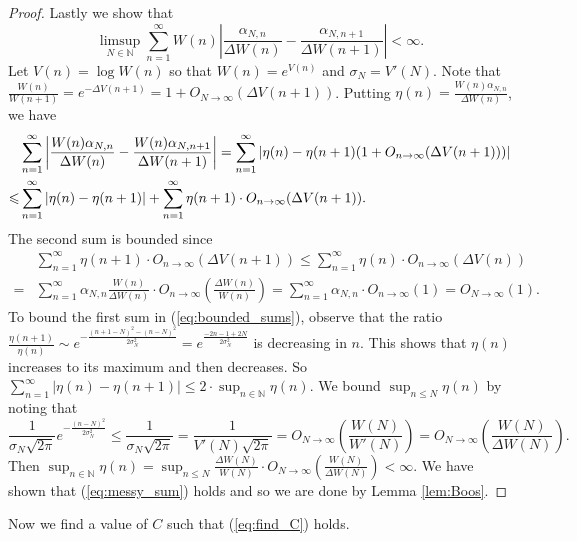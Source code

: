 \documentclass[12pt]{article}
\theoremstyle{plain} %
\theoremstyle{definition} %
\theoremstyle{plain}
\theoremstyle{plain}
\numberwithin{equation}{section}
\newcommand{\N}{\mathbb{N}}
\renewcommand{\leq}{\leqslant}
\newcommand{\1}{\mathbbm{1}}
\newcommand{\oo}{\infty}
\begin{document}
\begin{proof}
Lastly we show that
\begin{equation}\label{eq:messy_sum}
\limsup_{N\in \N} \sum_{n=1}^{\oo}W(n)\left|\frac{\alpha_{N,n}}{\Delta W(n)}-\frac{\alpha_{N,n+1}}{\Delta W(n+1)}\right|<\oo.
\end{equation}
Let $V(n) = \log W(n)$ so that $W(n) = e^{V(n)}$ and $\sigma_N = V'(N)$. Note that $\frac{ W(n)}{ W(n+1)} = e^{-\Delta V(n+1)} = 1+O_{N\to\oo}(\Delta V(n+1))$. Putting $\eta(n)= \frac{W(n)\alpha_{N,n}}{\Delta W(n)}$, we have
\begin{align}
  \notag & \sum_{n=1}^{\oo}\left|\frac{W(n)\alpha_{N,n}}{\Delta W(n)}-\frac{W(n)\alpha_{N,n+1}}{\Delta W(n+1)}\right| =\sum_{n=1}^{\oo}\left|\eta(n)-\eta(n+1)(1+O_{n\to\oo}(\Delta V(n+1)))\right|   \\
    \leq &\sum_{n=1}^{\oo}\left|\eta(n)-\eta(n+1)\right| +\sum_{n=1}^{\oo}\eta(n+1)\cdot O_{n\to\oo}(\Delta V(n+1)).\label{eq:bounded_sums}
    \end{align}
    The second sum is bounded since
    \begin{align*}
    &\sum_{n=1}^{\oo}\eta(n+1)\cdot O_{n\to\oo}(\Delta V(n+1)) \leq \sum_{n=1}^{\oo}\eta(n)\cdot O_{n\to\oo}(\Delta V(n))  
    \\ =& \sum_{n=1}^{\oo}\alpha_{N,n}\frac{W(n)}{\Delta W(n)}\cdot O_{n\to\oo} \left(\frac{\Delta W(n)}{W(n)}\right)=\sum_{n=1}^{\oo}\alpha_{N,n}\cdot O_{n\to\oo}(1)= O_{N\to\oo}(1).
    \end{align*}
    To bound the first sum in (\ref{eq:bounded_sums}), observe that the ratio $\frac{\eta(n+1)}{\eta(n)} \sim e^{-\frac{(n+1-N)^2-(n-N)^2}{2\sigma_N^2}} = e^{\frac{-2n-1+2N}{2\sigma_N^2}}$ is decreasing in $n$. This shows that $\eta(n)$ increases to its maximum and then decreases. So $\sum_{n=1}^{\oo}\left|\eta(n)-\eta(n+1)\right|
 \leq  2\cdot \sup_{n\in \N}\eta(n)$. We bound $\sup_{n\leq N}\eta(n)$ by noting that 
 \begin{equation*} 
 \frac{1}{\sigma_N\sqrt{2\pi}}e^{-\frac{(n-N)^2}{2\sigma_N^2}}\leq \frac{1}{\sigma_N\sqrt{2\pi}} = \frac{1}{ V'(N) \sqrt{2\pi}} = O_{N\to\oo}\left(\frac{W(N)}{ W'(N)}\right) = O_{N\to\oo}\left(\frac{W(N)}{ \Delta W(N)}\right).
 \end{equation*}
Then $\sup_{n\in \N}\eta(n) = \sup_{n\leq N}\frac{\Delta W(N)}{W(N)}\cdot O_{N\to\oo}\left(\frac{W(N)}{\Delta W(N)}\right) <\oo$. We have shown that  (\ref{eq:messy_sum}) holds and so we are done by Lemma \ref{lem:Boos}.
\end{proof}

Now we find a value of $C$ such that (\ref{eq:find_C}) holds.
\end{document}
